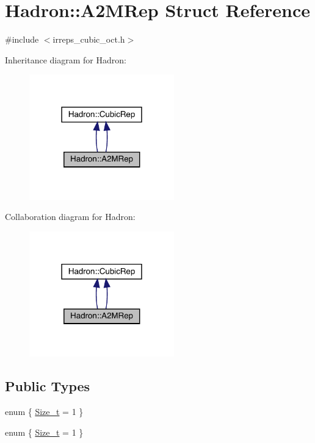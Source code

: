 \hypertarget{structHadron_1_1A2MRep}{}\section{Hadron\+:\+:A2\+M\+Rep Struct Reference}
\label{structHadron_1_1A2MRep}


{\ttfamily \#include $<$irreps\+\_\+cubic\+\_\+oct.\+h$>$}



Inheritance diagram for Hadron\+:\nopagebreak
\begin{figure}[H]
\begin{center}
\leavevmode
\includegraphics[width=178pt]{d5/dac/structHadron_1_1A2MRep__inherit__graph}
\end{center}
\end{figure}


Collaboration diagram for Hadron\+:\nopagebreak
\begin{figure}[H]
\begin{center}
\leavevmode
\includegraphics[width=178pt]{dc/dc6/structHadron_1_1A2MRep__coll__graph}
\end{center}
\end{figure}
\subsection*{Public Types}
\begin{DoxyCompactItemize}
\item 
enum \{ \mbox{\hyperlink{structHadron_1_1A2MRep_af2a2167bbb7b739844e0e0a9ab5bbb4ba7b3ea5f88e442ca6fa38c52bc3f32169}{Size\+\_\+t}} = 1
 \}
\item 
enum \{ \mbox{\hyperlink{structHadron_1_1A2MRep_af2a2167bbb7b739844e0e0a9ab5bbb4ba7b3ea5f88e442ca6fa38c52bc3f32169}{Size\+\_\+t}} = 1
 \}
\end{DoxyCompactItemize}
